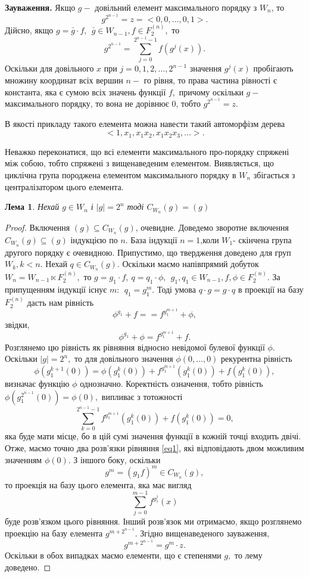 \documentclass[a4paper,12pt]{article} \usepackage{a4wide}
\numberwithin{equation}{subsection}
\newtheorem{lemma}{Лема}[subsection]
\begin{document}
{ \bf Зауваження.} Якщо $g-$ довільний елемент максимального порядку з $W_n$, то
\[ g^{2^{n-1}} = z = <0,0,\ldots,0,1> .\]
Дійсно, якщо  $g = \bar{g} \cdot f, \ \ \bar{g} \in W_{n-1},f \in F_2^{(n)}, $ то
\[ g^{2^{n-1}} = \sum_{j=0}^{2^{n-1}-1} f(g^j(x)).\]
Оскільки для довільного $x$ при $j = 0,1,2, \ldots ,2^{n-1}$
значення $g^j(x)$ пробігають множину координат всіх вершин $n-$ го
рівня, то права частина рівності є  константа, яка є сумою всіх
значень функції $f,$ причому оскільки $g-$ максимального порядку,
то вона не дорівнює 0, тобто $g^{2^{n-1}} = z$.

 В якості прикладу такого елемента можна навести такий автоморфізм дерева
\[<1,x_1,x_1  x_2, x_1  x_2  x_3 , \ldots > .\]

Неважко переконатися, що всі елементи максимального про-порядку спряжені між собою, тобто спряжені з вищенаведеним
елементом.
 Виявляється, що циклічна група породжена  елементом максимального порядку в $W_n$ збігається з централізатором цього
елемента.
\begin{lemma} \label{ficen} Нехай $g \in W_n $ і $ \mid g\mid =2^n$  тоді $C_{W_n}(g)=(g)$
\end{lemma}
\begin{proof}
Включення $(g)\subseteq C_{W_n}(g)  $, очевидне. Доведемо зворотне включення $C_{W_n}(g)\subseteq (g)$ індукцією по
$n$.  База індукції $n=1$,коли $W_1 $- скінчена група другого порядку є очевидною. Припустимо, що твердження доведено
для груп $W_k, k<n.$ Нехай $q \in C_{W_n}(g).$ Оскільки маємо напівпрямий добуток $W_n = W_{n-1} \ltimes F_{2}^{(n)},$
то $g = g_1 \cdot f, \ q = q_1 \cdot \phi , \ \ g_1, q_1 \in W_{n-1}, f, \phi \in F_{2}^{(n)}.$ За припущенням індукції
існує $m: \ \ q_1 = g_1^m.$ Тоді умова $q \cdot g = g \cdot q $ в проекції на базу $F_{2}^{(n)}$ дасть нам рівність
\[ \phi^{g_1} + f = = f^{g_1^{m+1}} + \phi,  \]
звідки,
\begin{equation}\label{eq1}
\phi^{g_1} + \phi =  f^{g_1^{m+1}} + f.
\end{equation}
Розглянемо цю рівність як рівняння відносно невідомої булевої функції $\phi.$ Оскільки $|g|=2^n,$ то для довільного
значення $\phi(0,\ldots,0)$ рекурентна рівність
\begin{equation}\label{eq2}
 \phi(g_1^{k+1}(0)) = \phi(g_1^{k}(0)) +  f^{g_1^{m+1}} (g_1^{k}(0)) + f(g_1^{k}(0)),
\end{equation}
 визначає функцію $\phi$ однозначно. Коректність означення, тобто рівність $\phi(g_1^{2^{n-1}}(0))= \phi(0),$
 випливає з  тотожності
 \[ \sum_{k=0}^{2^{n-1}-1} f^{g_1^{m+1}} (g_1^{k}(0)) + f(g_1^{k}(0)) = 0 ,\]
яка буде мати місце,  бо в цій сумі значення функції в кожній точці входить двічі. Отже, маємо точно два розв'язки
рівняння \eqref{eq1}, які відповідають двом можливим значенням $\phi(0).$ З іншого боку, оскільки
\[ g^m = \left ( g_1 f \right)^m \in C_{W_n}(g),\]
то проекція на базу цього елемента, яка має вигляд
\[ \sum_{j=0}^{m-1} f^{g_1^j} (x) \] буде розв'язком цього рівняння. Інший розв'язок ми отримаємо, якщо розглянемо
проекцію на базу елемента $ g^{m+2^{n-1}}$. Згідно вищенаведеного зауваження,
\[ g^{m+2^{n-1}} = g^m \cdot z. \]
 Оскільки в обох випадках маємо елементи, що є степенями $g,$ то лему доведено.
\end{proof}
\end{document}
